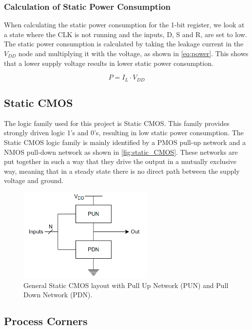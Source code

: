 \subsubsection{Calculation of Static Power Consumption}
\label{subsubsec:SPC_Calc}
When calculating the static power consumption for the 1-bit register, we look at a state where the CLK is not running and the inputs, D, S and R, are set to low. The static power consumption is calculated by taking the leakage current in the $V_{DD}$ node and multiplying it with the voltage, as shown in \autoref{eq:power}. This shows that a lower supply voltage results in lower static power consumption.

\begin{equation}
    \label{eq:power}
    P = I_L \cdot V_{DD}
\end{equation}

\subsection{Static CMOS}\label{subsec:static_cmos}

The logic family used for this project is Static CMOS. This family provides strongly driven logic 1's and 0's, resulting in low static power consumption. The Static CMOS logic family is mainly identified by a PMOS pull-up network and a NMOS pull-down network as shown in \autoref{fig:static_CMOS}. These networks are put together in such a way that they drive the output in a mutually exclusive way, meaning that in a steady state there is no direct path between the supply voltage and ground. 

\begin{figure}[H]
    \centering
    \includegraphics[width=0.6\textwidth]{Figures/Pull_UP_DOWN.png}
    \caption{General Static CMOS layout with Pull Up Network (PUN) and Pull Down Network (PDN).}
    \label{fig:static_CMOS}
\end{figure}


\subsection{Process Corners}
\label{subsec:corners}

